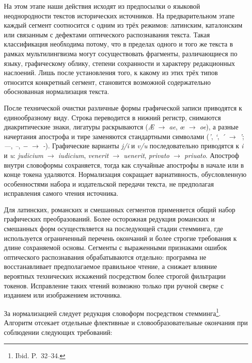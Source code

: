 На этом этапе наши действия исходят из предпосылки о языковой неоднородности текстов исторических источников. На предварительном этапе каждый сегмент соотносится с одним из трёх режимов: латинским, каталонским или связанным с дефектами оптического распознавания текста. Такая классификация необходима потому, что в пределах одного и того же текста в рамках мультилингвизма могут сосуществовать фрагменты, различающиеся по языку, графическому облику, степени сохранности и характеру редакционных наслоений. Лишь после установления того, к какому из этих трёх типов относится конкретный сегмент, становится возможной содержательно обоснованная нормализация текста.

После технической очистки различные формы графической записи приводятся к единообразному виду. Строка переводится в нижний регистр, снимаются диакритические знаки, лигатуры раскрываются (\emph{Æ} $\rightarrow$ \emph{ae}, \emph{œ} $\rightarrow$ \emph{oe}), а разные начертания апострофа и тире заменяются стандартными символами (\emph{’}, \emph{`}, \emph{´} $\rightarrow$ \emph{'}; \emph{---}, \emph{--}, \emph{−} $\rightarrow$ \emph{-}). Графические варианты \emph{j/i} и \emph{v/u} последовательно приводятся к \emph{i} и \emph{u}: \emph{judicium} $\rightarrow$ \emph{iudicium}, \emph{venerit} $\rightarrow$ \emph{uenerit}, \emph{privato} $\rightarrow$ \emph{priuato}. Апостроф внутри словоформы сохраняется, тогда как случайные апострофы в начале или в конце токена удаляются. Нормализация сокращает вариативность, обусловленную особенностями набора и издательской передачи текста, не предполагая исправления самого чтения источника.

Для латинских, романских и смешанных сегментов применяется общий набор графических преобразований. Более осторожная редукция романских и смешанных форм осуществляется на последующей стадии стемминга, где используется ограниченный перечень окончаний и более строгие требования к длине сохраняемой основы. Сегменты с выраженными признаками ошибок оптического распознавания обрабатываются отдельно: программа не восстанавливает предполагаемое правильное чтение, а снижает влияние вероятных технических искажений посредством более строгой фильтрации токенов. Исправление таких чтений возможно только при ручной сверке с изданием или изображением источника.

За нормализацией следует редукция словоформ посредством стемминга\footnote{Ibid. P.~32--34.}. Алгоритм отсекает отдельные флективные и словообразовательные окончания при соблюдении следующих требований:

